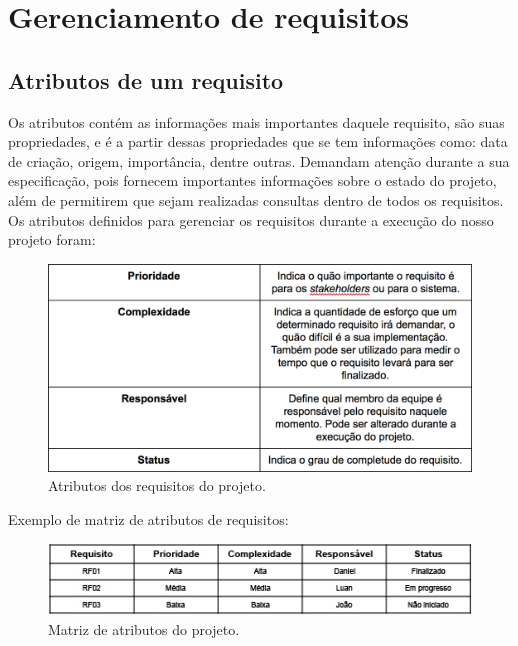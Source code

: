 \chapter[Gerenciamento de requisitos]{Gerenciamento de requisitos}
\section{Atributos de um requisito}
Os atributos contém as informações mais importantes daquele requisito, são suas propriedades, e é a partir dessas propriedades que se tem informações como: data de criação, origem, importância, dentre outras. Demandam atenção durante a sua especificação, pois fornecem importantes informações sobre o estado do projeto, além de permitirem que sejam realizadas consultas dentro de todos os requisitos.
Os atributos definidos para gerenciar os requisitos durante a execução do nosso projeto foram:
  \begin{figure}[!htbp]
    \centering
    \includegraphics[scale=0.65]{figuras/tabela_atributos}
    \caption[Atributos dos requisitos do projeto]{Atributos dos requisitos do projeto. \footnotemark}
    \label{tabela_atributos}
  \end{figure}
  
  Exemplo de matriz de atributos de requisitos:
    \begin{figure}[!htbp]
    \centering
    \includegraphics[scale=0.65]{figuras/matriz_atributos}
    \caption[Matriz de atributos do projeto.]{Matriz de atributos do projeto. \footnotemark}
    \label{tabela_matriz_atributos}
  \end{figure}

